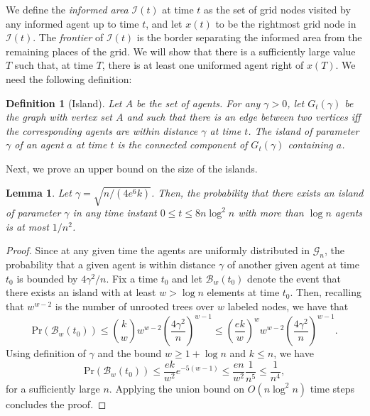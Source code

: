 \documentclass[11pt]{article}
\newcommand{\newterm}[1]{\emph{#1}}
\newcommand{\bigO}[1]{O\left(#1\right)}
\newcommand{\prob}[1]{\mathrm{Pr}\left({#1}\right)}
\newcommand{\B}{\mathcal{B}}
\newcommand{\I}{\mathcal{I}}
\newcommand{\grid}{\mathcal{G}_n}
\newcommand{\point}[1]{#1} \newcommand{\pos}[2]{x_{#1}(#2)} \newcommand{\mes}[2]{M_{#1}(#2)} \newcommand{\meet}[2]{\textrm{Meet}_{#1}(#2)}
\newtheorem{defi}{Definition}
\newtheorem{lemm}{Lemma}
\begin{document}
We define the \emph{informed area} $\I(t)$ at time $t$ as the set of
grid nodes visited by any informed agent up to time $t$, and let
$\point{x}(t)$ to be the rightmost grid node in $\I(t)$.  The
\newterm{frontier} of $\I(t)$ is the border separating the informed
area from the remaining places of the grid.  We will show that there is
a sufficiently large value $T$ such that, at time $T$, there is at
least one uniformed agent right of $\point{x}(T)$.  We need the
following definition:
\begin{defi}[Island]
\label{defi:Island}
Let $A$ be the set of agents.  For any $\gamma > 0$, let $G_t(\gamma)$
be the graph with vertex set $A$ and such that there is an edge
between two vertices iff the corresponding agents are within distance
$\gamma$ at time $t$.
The \newterm{island} of parameter $\gamma$ of
an agent $a$ at time $t$ is the connected component of $G_t(\gamma)$ containing $a$.
\end{defi}
Next, we prove an upper bound on the size of the islands.
\begin{lemm}
\label{lemm:NoBigNeighborhood}
Let $\gamma = \sqrt{n / (4 e^6 k)}$.
Then, the probability that there exists
an island of parameter $\gamma$
in any time instant $0 \leq t \leq 8 n \log^2 n$
with more than $\log n$ agents is at most $1/n^2$.
\end{lemm}
\begin{proof}
Since at any given time the agents are uniformly distributed in $\grid$,
the probability that a given agent is within distance $\gamma$
of another given agent at time $t_0$ is bounded by $4 \gamma^2 / n$.
Fix a time $t_0$ and let $\B_w(t_0)$ denote the event that
there exists an island with at least $w>\log n$ elements at time $t_0$. 
Then, recalling that $w^{w-2}$ is the number of unrooted 
trees over $w$ labeled nodes, we have that 
\[
	\prob{\B_w(t_0)}
		\leq \binom{k}{w} w^{w-2} \left(\frac{4 \gamma^2}{n}\right)^{w-1}
		\leq \left(\frac{ek}{w}\right)^w w^{w-2} \left(\frac{4 \gamma^2}{n}\right)^{w-1}.
\]
Using definition of $\gamma$ and the bound $w \geq 1 + \log n$ and $k \leq n$, we have 
\[
	\prob{\B_w(t_0)} \leq \frac{ek}{w^2} e^{-5(w-1)}\leq \frac{e n}{w^2} \frac{1}{n^5}
		\leq \frac{1}{n^4},
\]
for a sufficiently large $n$.
Applying the union bound on $\bigO{n \log^2 n}$ time steps concludes the proof.
\end{proof}
\end{document}
